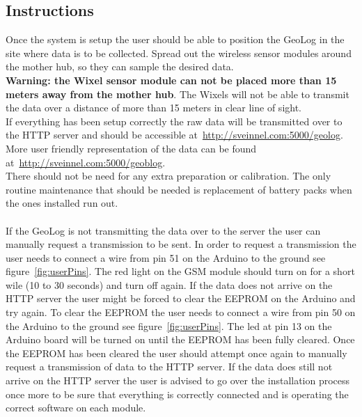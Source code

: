 \subsection{Instructions}
Once the system is setup the user should be able to position the GeoLog in the site where data is to be collected. Spread out the wireless sensor modules around the mother hub, so they can sample the desired data.\\
\textbf{Warning: the Wixel sensor module can not be placed more than 15 meters away from the mother hub}. The Wixels will not be able to transmit the data over a distance of more than 15 meters in clear line of sight.\\
If everything has been setup correctly the raw data will be transmitted over to the HTTP server and should be accessible at~\url{http://sveinnel.com:5000/geolog}. More user friendly representation of the data can be found at~\url{http://sveinnel.com:5000/geoblog}.\\
There should not be need for any extra preparation or calibration. The only routine maintenance that should be needed is replacement of battery packs when the ones installed run out.\\\\ %
If the GeoLog is not transmitting the data over to the server the user can manually request a transmission to be sent. In order to request a transmission the user needs to connect a wire from pin 51 on the Arduino to the ground see figure~\ref{fig:userPins}. The red light on the GSM module should turn on for a short wile (10 to 30 seconds) and turn off again. If the data does not arrive on the HTTP server the user might be forced to clear the EEPROM on the Arduino and try again. To clear the EEPROM the user needs to connect a wire from pin 50 on the Arduino to the ground see figure~\ref{fig:userPins}. The led at pin 13 on the Arduino board will be turned on until the EEPROM has been fully cleared. Once the EEPROM has been cleared the user should attempt once again to manually request a transmission of data to the HTTP server. If the data does still not arrive on the HTTP server the user is advised to go over the installation process once more to be sure that everything is correctly connected and is operating the correct software on each module.

